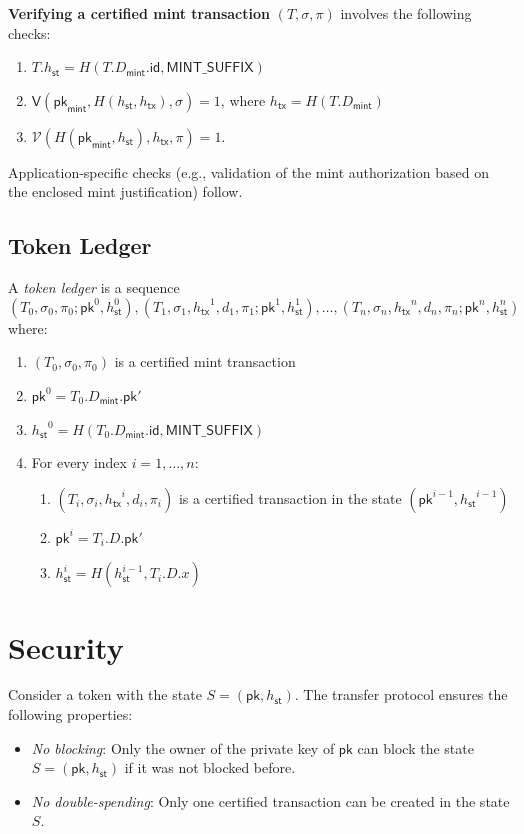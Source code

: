 \documentclass{article}
\newcommand{\sigver}[0]{\mathsf{V}}
\newcommand{\pubkey}[0]{\mathsf{pk}}
\newcommand{\sthash}[0]{{h_\mathsf{st}}}
\newcommand{\txhash}[0]{{h_\mathsf{tx}}}
\newcommand{\univer}[0]{\mathcal{V}}
\begin{document}
\noindent\textbf{Verifying a certified mint transaction} $(T,\sigma,\pi)$ involves the following checks:
\begin{enumerate}
	\item $T.\sthash= H(T.D_\mathsf{mint}.\mathsf{id}, \mathsf{MINT\_SUFFIX})$
	\item $\sigver(\pubkey_\mathsf{mint}, H(\sthash,\txhash),\sigma)=1$, where $\txhash = H(T.D_\mathsf{mint})$
	\item $\univer(H(\pubkey_\mathsf{mint},\sthash),\txhash,\pi)=1$.
\end{enumerate}

\noindent Application-specific checks (e.g., validation of the mint authorization based on the enclosed mint justification) follow.

\subsection{Token Ledger}

A \emph{token ledger} is a sequence
\[
(T_0, \sigma_0, \pi_0; \pubkey^0, h^0_\mathsf{st}), (T_1, \sigma_1,\txhash^1,d_1,\pi_1; \pubkey^1, h^1_\mathsf{st}), \ldots, (T_n, \sigma_n, \txhash^n, d_n,\pi_n; \pubkey^n,h^n_\mathsf{st})
\]
where:
\begin{enumerate}
\item $(T_0, \sigma_0, \pi_0)$ is a certified mint transaction
\item $\pubkey^0=T_0.D_\mathsf{mint}.\pubkey'$
\item $\sthash^{0}=H(T_0.D_\mathsf{mint}.\mathsf{id},\mathsf{MINT\_SUFFIX})$
\item For every index $i=1,\ldots, n$:
\begin{enumerate}
\item[3.3.] $(T_{i}, \sigma_{i}, \txhash^i,d_i, \pi_{i})$ is a certified transaction in the state $(\pubkey^{i-1}, \sthash^{i-1})$
\item[3.1.] $\pubkey^i = T_{i}.D.\pubkey'$
\item[3.2.] $h^{i}_\mathsf{st}=H(h^{i-1}_\mathsf{st},T_{i}.D.x)$
\end{enumerate}
\end{enumerate}


\section{Security}\label{sec:security}
Consider a token with the state $S = (\pubkey, \sthash)$. The transfer protocol ensures the following properties:
\begin{itemize}
\item \emph{No blocking}:
Only the owner of the private key of $\pubkey$ can block the state $S = (\pubkey, \sthash)$ if it was not blocked before.
\item \emph{No double-spending}:
Only one certified transaction can be created in the state $S$.
\end{itemize}
\end{document}

